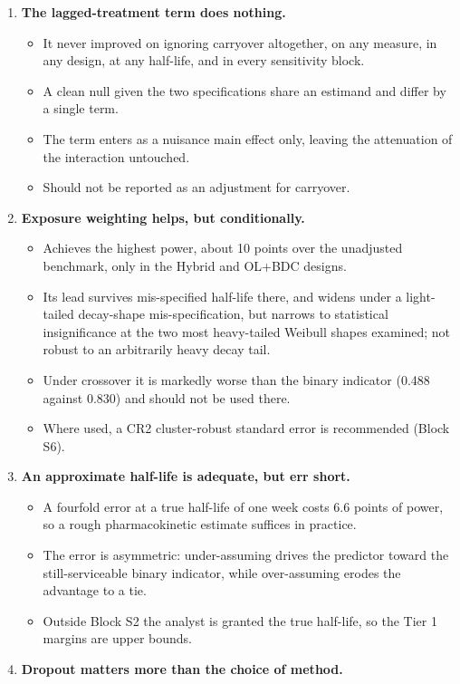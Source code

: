 \documentclass[
  11pt,
]{article}
\providecommand{\tightlist}{%
  \setlength{\itemsep}{0pt}\setlength{\parskip}{0pt}}
\begin{document}
\begin{enumerate}
\def\labelenumi{\arabic{enumi}.}
\tightlist
\item
  \textbf{The lagged-treatment term does nothing.}

  \begin{itemize}
  \tightlist
  \item
    It never improved on ignoring carryover altogether, on any
    measure, in any design, at any half-life, and in every
    sensitivity block.
  \item
    A clean null given the two specifications share an estimand and
    differ by a single term.
  \item
    The term enters as a nuisance main effect only, leaving the
    attenuation of the interaction untouched.
  \item
    Should not be reported as an adjustment for carryover.
  \end{itemize}
\item
  \textbf{Exposure weighting helps, but conditionally.}

  \begin{itemize}
  \tightlist
  \item
    Achieves the highest power, about 10 points over the unadjusted
    benchmark, only in the Hybrid and OL+BDC designs.
  \item
    Its lead survives mis-specified half-life there, and widens
    under a light-tailed decay-shape mis-specification, but narrows
    to statistical insignificance at the two most heavy-tailed
    Weibull shapes examined; not robust to an arbitrarily heavy
    decay tail.
  \item
    Under crossover it is markedly worse than the binary indicator
    (0.488 against 0.830) and should not be used there.
  \item
    Where used, a CR2 cluster-robust standard error is recommended
    (Block S6).
  \end{itemize}
\item
  \textbf{An approximate half-life is adequate, but err short.}

  \begin{itemize}
  \tightlist
  \item
    A fourfold error at a true half-life of one week costs 6.6
    points of power, so a rough pharmacokinetic estimate suffices in
    practice.
  \item
    The error is asymmetric: under-assuming drives the predictor
    toward the still-serviceable binary indicator, while
    over-assuming erodes the advantage to a tie.
  \item
    Outside Block S2 the analyst is granted the true half-life, so
    the Tier 1 margins are upper bounds.
  \end{itemize}
\item
  \textbf{Dropout matters more than the choice of method.}


\end{enumerate}
\end{document}
